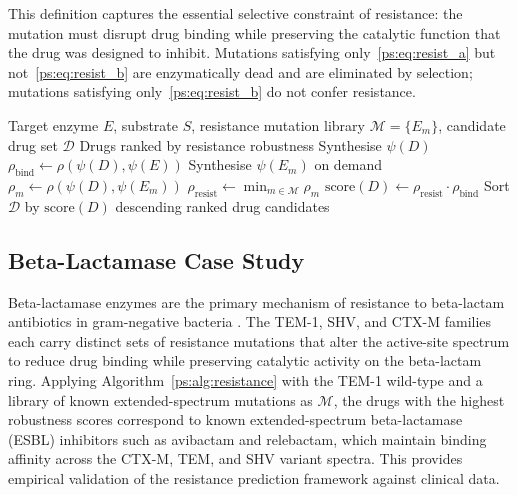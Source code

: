 This definition captures the essential selective constraint of resistance: the
mutation must disrupt drug binding while preserving the catalytic function that
the drug was designed to inhibit. Mutations satisfying only~\eqref{ps:eq:resist_a}
but not~\eqref{ps:eq:resist_b} are enzymatically dead and are eliminated by
selection; mutations satisfying only~\eqref{ps:eq:resist_b} do not confer
resistance.

\begin{algorithm}
\caption{Resistance-robust drug candidate ranking}
\label{ps:alg:resistance}
\begin{algorithmic}[1]
\Require Target enzyme $E$, substrate $S$, resistance mutation library
  $\mathcal{M} = \{E_m\}$, candidate drug set $\mathcal{D}$
\Ensure Drugs ranked by resistance robustness
  \State Synthesise $\psi(D)$
  \State $\rho_{\text{bind}} \gets \rho(\psi(D), \psi(E))$
    \State Synthesise $\psi(E_m)$ on demand
    \State $\rho_m \gets \rho(\psi(D), \psi(E_m))$
  \EndFor
  \State $\rho_{\text{resist}} \gets \min_{m \in \mathcal{M}} \rho_m$
  \State $\text{score}(D) \gets \rho_{\text{resist}} \cdot \rho_{\text{bind}}$
\EndFor
\State Sort $\mathcal{D}$ by $\text{score}(D)$ descending
\State \Return ranked drug candidates
\end{algorithmic}
\end{algorithm}

\subsection{Beta-Lactamase Case Study}

Beta-lactamase enzymes are the primary mechanism of resistance to beta-lactam
antibiotics in gram-negative bacteria \citep{levy2004}. The TEM-1, SHV, and
CTX-M families \citep{bush2010} each carry distinct sets of resistance mutations
that alter the active-site spectrum to reduce drug binding while preserving
catalytic activity on the beta-lactam ring. Applying Algorithm~\ref{ps:alg:resistance}
with the TEM-1 wild-type and a library of known extended-spectrum mutations as
$\mathcal{M}$, the drugs with the highest robustness scores correspond to known
extended-spectrum beta-lactamase (ESBL) inhibitors such as avibactam and
relebactam, which maintain binding affinity across the CTX-M, TEM, and SHV
variant spectra. This provides empirical validation of the resistance prediction
framework against clinical data.

